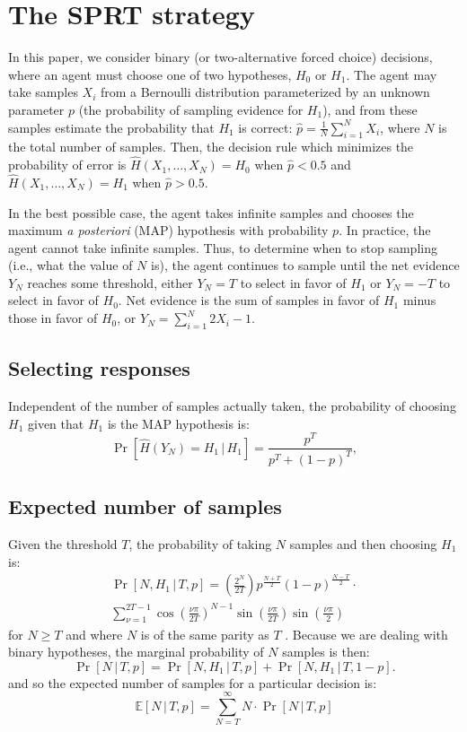 \documentclass[10pt,letterpaper]{article}
\begin{document}
\section{The SPRT strategy}

In this paper, we consider binary (or two-alternative forced choice) decisions, where an agent must choose one of two hypotheses, $H_0$ or $H_1$. The agent may take samples $X_i$ from a Bernoulli distribution parameterized by an unknown parameter $p$ (the probability of sampling evidence for $H_1$), and from these samples estimate the probability that $H_1$ is correct: $\hat{p}=\frac{1}{N}\sum_{i=1}^N X_i$, where $N$ is the total number of samples. Then, the decision rule which minimizes the probability of error is $\hat{H}(X_1,\ldots{},X_N)=H_0$ when $\hat{p}<0.5$ and $\hat{H}(X_1,\ldots{},X_N)=H_1$ when $\hat{p}>0.5$.

In the best possible case, the agent takes infinite samples and chooses the maximum \emph{a posteriori} (MAP) hypothesis with probability $p$. In practice, the agent cannot take infinite samples. Thus, to determine when to stop sampling (i.e., what the value of $N$ is), the agent continues to sample until the net evidence $Y_N$ reaches some threshold, either $Y_N=T$ to select in favor of $H_1$ or $Y_N=-T$ to select in favor of $H_0$. Net evidence is the sum of samples in favor of $H_1$ minus those in favor of $H_0$, or $Y_N=\sum_{i=1}^N 2X_i-1$.

\subsection{Selecting responses} Independent of the number of samples actually taken, the probability of choosing $H_1$ given that $H_1$ is the MAP hypothesis is:
\begin{equation}
\Pr[\hat{H}(Y_N)=H_1\,|\,H_1]=\frac{p^T}{p^T+(1-p)^T},
\label{eq:pr-choose-h1}
\end{equation}

\subsection{Expected number of samples} Given the threshold $T$, the probability of taking $N$ samples and then choosing $H_1$ is:
\begin{multline}
\Pr[N,H_1\,|\,T,p]=\left(\frac{2^N}{2T}\right)p^{\frac{N+T}{2}}(1-p)^{\frac{N-T}{2}}\cdot{}\\
\sum_{\nu=1}^{2T-1}\cos\left(\frac{\nu\pi}{2T}\right)^{N-1}\sin\left(\frac{\nu\pi}{2T}\right)\sin\left(\frac{\nu\pi}{2}\right)
\end{multline}
for $N\geq T$ and where $N$ is of the same parity as $T$ \cite[ch.~XIV, eq. 5.7]{Feller:1968ut}. Because we are dealing with binary hypotheses, the marginal probability of $N$ samples is then:
\begin{equation}
\Pr[N\,|\,T,p]=\Pr[N,H_1\,|\,T,p]+\Pr[N,H_1\,|\,T,1-p].
\label{eq:pr-n}
\end{equation}
and so the expected number of samples for a particular decision is:
\begin{equation}
\mathbb{E}[N\,|\,T,p]=\sum_{N=T}^\infty N\cdot{}\Pr[N\,|\,T,p]
\label{eq:expsamp}
\end{equation}
\end{document}
